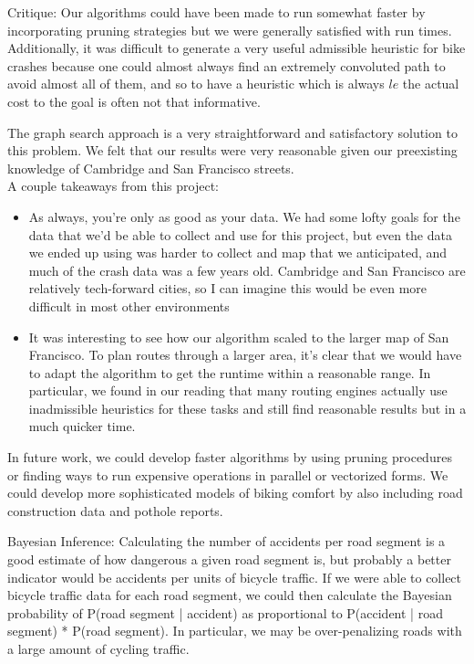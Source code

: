 \documentclass[11pt]{article}
\begin{document}
{Critique:} Our algorithms could have been made to run somewhat faster by incorporating pruning strategies but we were generally satisfied with run times. Additionally, it was difficult to generate a very useful admissible heuristic for bike crashes because one could almost always find an extremely convoluted path to avoid almost all of them, and so to have a heuristic which is always $le$ the actual cost to the goal is often not that informative.

The graph search approach is a very straightforward and satisfactory solution to this problem. We felt that our results were very reasonable given our preexisting knowledge of Cambridge and San Francisco streets. \\
A couple takeaways from this project:
\begin{itemize}
\item As always, you're only as good as your data. We had some lofty goals for the data that we'd be able to collect and use for this project, but even the data we ended up using was harder to collect and map that we anticipated, and much of the crash data was a few years old. Cambridge and San Francisco are relatively tech-forward cities, so I can imagine this would be even more difficult in most other environments
\item It was interesting to see how our algorithm scaled to the larger map of San Francisco. To plan routes through a larger area, it's clear that we would have to adapt the algorithm to get the runtime within a reasonable range. In particular, we found in our reading that many routing engines actually use inadmissible heuristics for these tasks and still find reasonable results but in a much quicker time.
\end{itemize}

In future work, we could develop faster algorithms by using pruning procedures or finding ways to run expensive operations in parallel or vectorized forms. We could develop more sophisticated models of biking comfort by also including road construction data and pothole reports.

Bayesian Inference:
Calculating the number of accidents per road segment is a good estimate of how dangerous a given road segment is, but probably a better indicator would be accidents per units of bicycle traffic. If we were able to collect bicycle traffic data for each road segment, we could then calculate the Bayesian probability of 
P(road segment | accident) as proportional to P(accident | road segment) * P(road segment). In particular, we may be over-penalizing roads with a large amount of cycling traffic.
\end{document}
